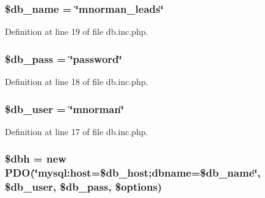 \hypertarget{db_8inc_8php_a26dcb19f4431598ddd5f58147f131bee}{
\subsubsection[{\$db\-\_\-name}]{\setlength{\rightskip}{0pt plus 5cm}\$db\-\_\-name = \char`\"{}mnorman\-\_\-leads\char`\"{}}}\label{db_8inc_8php_a26dcb19f4431598ddd5f58147f131bee}


Definition at line 19 of file db.\-inc.\-php.

\hypertarget{db_8inc_8php_a6a1544d19fb430d3665ad3744747197a}{
\subsubsection[{\$db\-\_\-pass}]{\setlength{\rightskip}{0pt plus 5cm}\$db\-\_\-pass = \char`\"{}password\char`\"{}}}\label{db_8inc_8php_a6a1544d19fb430d3665ad3744747197a}


Definition at line 18 of file db.\-inc.\-php.

\hypertarget{db_8inc_8php_a6a2ff59abacecba75a151826de414a27}{
\subsubsection[{\$db\-\_\-user}]{\setlength{\rightskip}{0pt plus 5cm}\$db\-\_\-user = \char`\"{}mnorman\char`\"{}}}\label{db_8inc_8php_a6a2ff59abacecba75a151826de414a27}


Definition at line 17 of file db.\-inc.\-php.

\hypertarget{db_8inc_8php_acc1e62674bb7200ea73767c19dc1344d}{
\subsubsection[{\$dbh}]{\setlength{\rightskip}{0pt plus 5cm}\$dbh = new P\-D\-O(\char`\"{}mysql\-:host=\$db\-\_\-host;dbname=\$db\-\_\-name\char`\"{}, \$db\-\_\-user, \$db\-\_\-pass, \$options)}}\label{db_8inc_8php_acc1e62674bb7200ea73767c19dc1344d}


